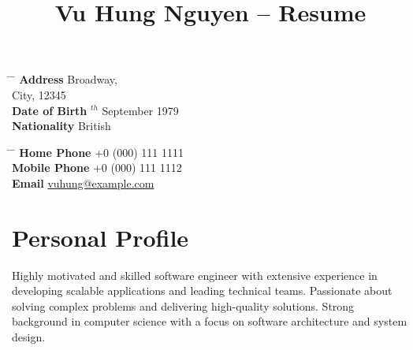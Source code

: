 \documentclass[10pt]{article} %
\begin{document}

\title{Vu Hung Nguyen -- Resume} %


\parbox{0.5\textwidth}{ %
\begin{tabbing} %
\hspace{3cm} \= \hspace{4cm} \= \kill %
{\bf Address}  Broadway,\\ %
\> City, 12345 \\ %
{\bf Date of Birth} $^{th}$ September 1979 \\ %
{\bf Nationality} \> British %
\end{tabbing}}
\hfill %
\parbox{0.5\textwidth}{ %
\begin{tabbing} %
\hspace{3cm} \= \hspace{4cm} \= \kill %
{\bf Home Phone} \> +0 (000) 111 1111 \\ %
{\bf Mobile Phone} \> +0 (000) 111 1112 \\ %
{\bf Email} \> \href{mailto:vuhung@example.com}{vuhung@example.com} \\ %
\end{tabbing}}


\section{Personal Profile}

Highly motivated and skilled software engineer with extensive experience in developing scalable applications and leading technical teams. Passionate about solving complex problems and delivering high-quality solutions. Strong background in computer science with a focus on software architecture and system design.
\end{document}
